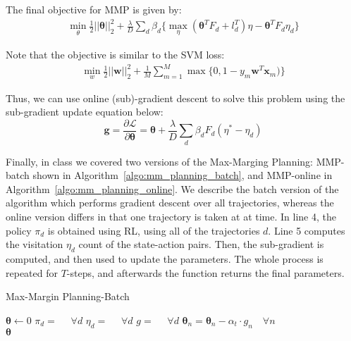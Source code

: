 \documentclass[11pt]{article}
\begin{document}
The final objective for MMP is given by:
\begin{equation}
    \label{eq:final_min_obj_mmp}
    \begin{split}
        \min\limits_{\theta} \frac{1}{2}||\boldsymbol{\theta}||_2^2
        + \frac{\lambda}{D} \sum\limits_d \beta_d \big\{ \max\limits_\eta(\boldsymbol{\theta}^T F_d + l_d^T)\eta  - \boldsymbol{\theta}^T F_d \eta_d \big\}
    \end{split}
\end{equation}

Note that the objective is similar to the SVM loss:
\begin{equation}
    \label{eq:final_min_obj_mmp}
    \begin{split}
        \min\limits_{w} \frac{1}{2}||\boldsymbol{w}||_2^2
        + \frac{1}{M} \sum\limits_{m=1}^M \max\{0, 1 - y_m\boldsymbol{w}^T \boldsymbol{x}_m)\}
    \end{split}
\end{equation}

Thus, we can use online (sub)-gradient descent to solve this problem using the sub-gradient update equation below:
\begin{equation}
    \boldsymbol{g} = \frac{\partial \mathcal{L}}{\partial \boldsymbol{\theta}} = 
    \boldsymbol{\theta} + \frac{\lambda}{D} \sum\limits_d \beta_d F_d(\eta^\ast - \eta_d)
\end{equation}

Finally, in class we covered two versions of the Max-Marging Planning: MMP-batch shown in Algorithm~\ref{algo:mm_planning_batch}, and MMP-online in Algorithm~\ref{algo:mm_planning_online}. We describe the batch version of the algorithm which performs gradient descent over all trajectories, whereas the online version differs in that one trajectory is taken at at time. In line 4, the policy $\pi_d$ is obtained using RL, using all of the trajectories $d$. Line 5 computes the visitation $\eta_d$ count of the state-action pairs. Then, the sub-gradient is computed, and then used to update the parameters. The whole process is repeated for $T$-steps, and afterwards the function returns the final parameters.  

\begin{algorithm}[H]
    \label{algo:mm_planning_batch}
    \caption{Max-Margin Planning-Batch}
    \begin{algorithmic}[1]
    \State $\boldsymbol\theta \leftarrow 0$
    \State $\pi_d =$  $\quad \forall d$
    \State $\eta_d = $  $\quad\forall d$
    \State $g = $  $ \quad\forall d$
    \State $\boldsymbol\theta_n = \boldsymbol\theta_n - \alpha_t \cdot g_n \quad\forall n$
    \EndFor \\
    \Return $\boldsymbol\theta$
    \EndFunction
    \end{algorithmic}
\end{algorithm}
\end{document}
